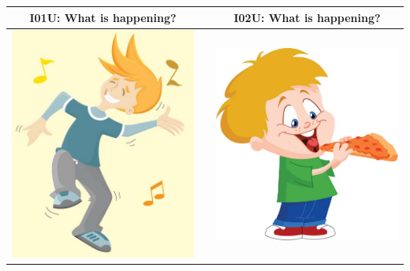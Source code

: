 \documentclass[12pt,notitlepage]{article}
\begin{document}
\begin{center}
\newpage


\begin{tabular}{|c|c|c|}
\hline
I01U: What is happening? && I02U: What is happening? \\
\hline
\includegraphics[width=20em,trim=0 0 0 -3]{figures/I01.jpg} & & \includegraphics[width=20em,trim=0 0 0 -3]{figures/I02.jpg} \\
\hline
\end{tabular}
\vspace{1em} \\



\end{center}
\end{document}
